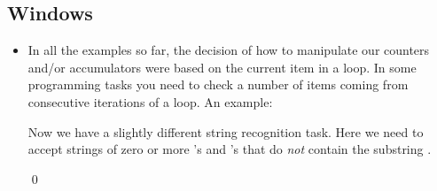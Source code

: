 \documentclass[a4paper]{article}
\begin{document}
{\subsection{Windows}

\begin{itemize}

\item In all the examples so far, the decision of how to manipulate our counters
and/or accumulators were based on the current item in a loop. In some programming
tasks you need to check a number of items coming from consecutive iterations of
a loop. An example:

\begin{uexample}

Now we have a slightly different string recognition task. 
Here we need to accept strings of zero or more 's and 's that do \emph{not}
contain the substring .

\begin{ucodeframe}
\end{ucodeframe}

\qed
\end{uexample}
\end{itemize}

}
\end{document}
